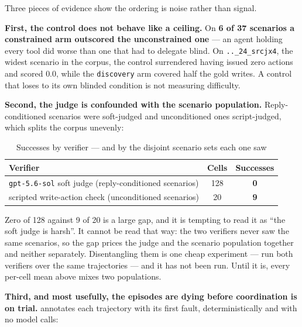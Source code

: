 \documentclass[11pt,a4paper]{article}
\begin{document}
Three pieces of evidence show the ordering is noise rather than signal.

\textbf{First, the control does not behave like a ceiling.} On \textbf{6 of 37 scenarios a constrained arm outscored the unconstrained one} --- an agent holding every tool did worse than one that had to delegate blind. On \texttt{..\_24\_srcjx4}, the widest scenario in the corpus, the control surrendered having issued zero actions and scored $0.0$, while the \texttt{discovery} arm covered half the gold writes. A control that loses to its own blinded condition is not measuring difficulty.

\textbf{Second, the judge is confounded with the scenario population.} Reply-conditioned scenarios were soft-judged and unconditioned ones script-judged, which splits the corpus unevenly:

\begin{table}[H]
\centering
\small
\caption{Successes by verifier --- and by the disjoint scenario sets each one saw}
\label{tab:judges}
\begin{tabularx}{\textwidth}{X c c}
\toprule
Verifier & Cells & Successes\\
\midrule
\texttt{gpt-5.6-sol} soft judge (reply-conditioned scenarios) & 128 & \textbf{0}\\
scripted write-action check (unconditioned scenarios) & 20 & \textbf{9}\\
\bottomrule
\end{tabularx}
\end{table}

Zero of 128 against 9 of 20 is a large gap, and it is tempting to read it as ``the soft judge is harsh''. It cannot be read that way: the two verifiers never saw the same scenarios, so the gap prices the judge and the scenario population together and neither separately. Disentangling them is one cheap experiment --- run both verifiers over the same trajectories --- and it has not been run. Until it is, every per-cell mean above mixes two populations.

\textbf{Third, and most usefully, the episodes are dying before coordination is on trial.}  annotates each trajectory with its first fault, deterministically and with no model calls:
\end{document}
